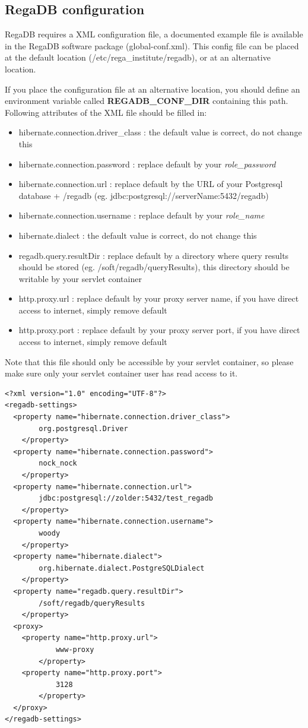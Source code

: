 \subsection{RegaDB configuration}
RegaDB requires a XML configuration file, a documented example file is available in the RegaDB software package (global-conf.xml). This config file can be placed at the default location (/etc/rega\_institute/regadb), or at an alternative location.

If you place the configuration file at an alternative location, you should define an environment variable called \textbf{REGADB\_CONF\_DIR} containing this path.
Following attributes of the XML file should be filled in:
\begin{itemize}
\item hibernate.connection.driver\_class : the default value is correct, do not change this
\item hibernate.connection.password : replace default by your \textit{role\_password}
\item hibernate.connection.url : replace default by the URL of your Postgresql database + /regadb (eg. jdbc:postgresql://serverName:5432/regadb)
\item hibernate.connection.username : replace default by your \textit{role\_name}
\item hibernate.dialect : the default value is correct, do not change this
\item regadb.query.resultDir : replace default by a directory where query results should be stored (eg. /soft/regadb/queryResults), this directory should be writable by your servlet container
\item http.proxy.url : replace default by your proxy server name, if you have direct access to internet, simply remove default
\item http.proxy.port : replace default by your proxy server port, if you have direct access to internet, simply remove default
\end{itemize}

Note that this file should only be accessible by your servlet container, so please make sure only your servlet container user has read access to it.

\begin{lstlisting}
<?xml version="1.0" encoding="UTF-8"?>
<regadb-settings>
  <property name="hibernate.connection.driver_class">
		org.postgresql.Driver
	</property>
  <property name="hibernate.connection.password">
		nock_nock
	</property>
  <property name="hibernate.connection.url">
		jdbc:postgresql://zolder:5432/test_regadb
	</property>
  <property name="hibernate.connection.username">
		woody
	</property>
  <property name="hibernate.dialect">
		org.hibernate.dialect.PostgreSQLDialect
	</property>
  <property name="regadb.query.resultDir">
		/soft/regadb/queryResults
	</property>
  <proxy>
    <property name="http.proxy.url">
			www-proxy
		</property>
    <property name="http.proxy.port">
			3128
		</property>
  </proxy>
</regadb-settings>
\end{lstlisting}

